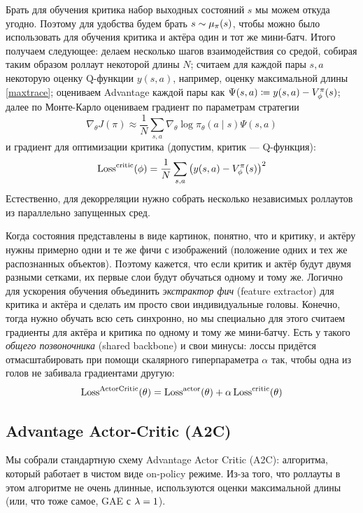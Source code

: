 Брать для обучения критика набор выходных состояний $s$ мы можем откуда угодно. Поэтому для удобства будем брать $s \HM\sim \mu_\pi(s)$, чтобы можно было использовать для обучения критика и актёра один и тот же мини-батч. Итого получаем следующее: делаем несколько шагов взаимодействия со средой, собирая таким образом роллаут некоторой длины $N$; считаем для каждой пары $s, a$ некоторую оценку Q-функции $y(s, a)$, например, оценку максимальной длины \eqref{maxtrace}; оцениваем Advantage каждой пары как $\Psi(s, a) \HM \coloneqq y(s, a) - V^{\pi}_{\phi}(s)$; далее по Монте-Карло оцениваем градиент по параметрам стратегии
$$\nabla_\theta J(\pi) \approx \frac{1}{N} \sum_{s, a} \nabla_{\theta} \log \pi_\theta (a \mid s) \Psi(s, a)$$
и градиент для оптимизации критика (допустим, критик --- Q-функция):
$$\operatorname{Loss}^{\mathrm{critic}}(\phi) = \frac{1}{N} \sum_{s, a} \left( y(s, a) - V^{\pi}_{\phi}(s) \right)^2$$
Естественно, для декорреляции нужно собрать несколько независимых роллаутов из параллельно запущенных сред.

\begin{remark}
Когда состояния представлены в виде картинок, понятно, что и критику, и актёру нужны примерно одни и те же фичи с изображений (положение одних и тех же распознанных объектов). Поэтому кажется, что если критик и актёр будут двумя разными сетками, их первые слои будут обучаться одному и тому же. Логично для ускорения обучения объединить \emph{экстрактор фич} (feature extractor) для критика и актёра и сделать им просто свои индивидуальные головы. Конечно, тогда нужно обучать всю сеть синхронно, но мы специально для этого считаем градиенты для актёра и критика по одному и тому же мини-батчу. Есть у такого \emph{общего позвоночника} (shared backbone) и свои минусы: лоссы придётся отмасштабировать при помощи скалярного гиперпараметра $\alpha$ так, чтобы одна из голов не забивала градиентами другую:
$$\operatorname{Loss}^{\mathrm{ActorCritic}}(\theta) = \operatorname{Loss}^{\mathrm{actor}}(\theta) + \alpha \operatorname{Loss}^{\mathrm{critic}}(\theta)$$
\end{remark}

\subsection{Advantage Actor-Critic (A2C)}

Мы собрали стандартную схему Advantage Actor Critic (A2C): алгоритма, который работает в чистом виде on-policy режиме. Из-за того, что роллауты в этом алгоритме не очень длинные, используются оценки максимальной длины (или, что тоже самое, GAE с $\lambda \HM= 1$). 

